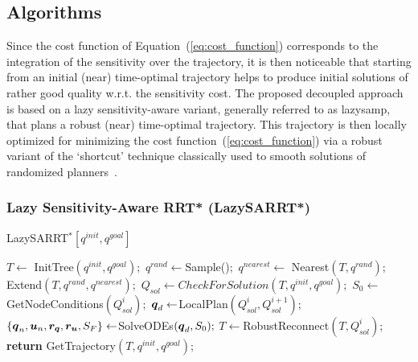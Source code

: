 \subsection{Algorithms}

Since the cost function of Equation~(\ref{eq:cost_function}) corresponds to the integration of the sensitivity over the trajectory, it is then noticeable that starting from an initial (near) time-optimal trajectory helps to produce initial solutions of rather good quality w.r.t. the sensitivity cost.
The proposed decoupled approach is based on a lazy sensitivity-aware variant, generally referred to as \gls{lazysamp}, that plans a robust (near) time-optimal trajectory.
This trajectory is then locally optimized for minimizing the cost function~(\ref{eq:cost_function}) via a robust variant of the `shortcut' technique classically used to smooth solutions of randomized planners~\cite{cShortcut}. 

\subsubsection{Lazy Sensitivity-Aware RRT* (LazySARRT*)}\label{sec:lazy_rrt*}

\begin{algorithm}[htp]
    \caption{LazySARRT$^* [q^{init}, q^{goal}]$}\label{alg:LazySARRT*}
    \begin{algorithmic}[1]
        \State $T \gets$ InitTree$({q^{init}, q^{goal}});$
            \State $q^{rand} \gets $Sample()$;$
            \State $q^{nearest} \gets$ Nearest$(T,{q^{rand}});$
            \State Extend$(T, q^{rand}, q^{nearest});$
            \State $Q_{sol} \gets CheckForSolution(T, q^{init}, q^{goal});$
                    \State $S_0 \gets $GetNodeConditions$(Q_{sol}^{i});$
                    \State $\boldsymbol{q}_d \gets $LocalPlan$(Q_{sol}^{i}, Q_{sol}^{i+1});$
                    \State $\left \{\boldsymbol{q}_n, \boldsymbol{u}_n, \boldsymbol{r_q}, \boldsymbol{r_u}, S_F \right \}  \gets $SolveODEs$(\boldsymbol{q}_d, S_0);$
                        \State $T \gets $RobustReconnect$(T, Q_{sol}^{i});$
                    \EndIf
                \EndFor
            \EndIf
        \EndWhile
        \State \textbf{return} GetTrajectory$(T, q^{init}, q^{goal})$;
    \end{algorithmic}
\end{algorithm}

